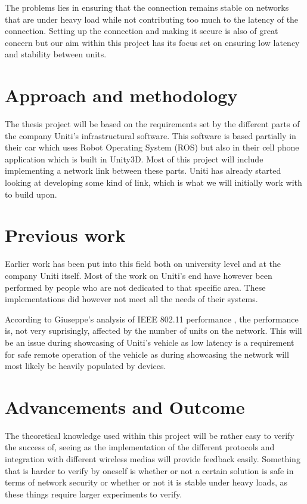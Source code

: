 \documentclass[a4paper]{article}
\begin{document}
The problems lies in ensuring that the connection remains stable on
networks that are under heavy load while not contributing too much to the
latency of the connection. Setting up the connection and making it secure 
is also of great concern but our aim within this project has its focus 
set on ensuring low latency and stability between units.

\section{Approach and methodology}
The thesis project will be based on the requirements set by the different parts
of the company Uniti's infrastructural software. This software is based
partially in their car which uses Robot Operating System (ROS) but also in
their cell phone application which is built in Unity3D. Most of this project
will include implementing a network link between these parts. Uniti has
already started looking at developing some kind of link, which is what
we will initially work with to build upon.


\section{Previous work}
Earlier work has been put into this field both on university level and at the
company Uniti itself. Most of the work on Uniti's end have however been
performed by people who are not dedicated to that specific area.
These implementations did however not meet all the needs of their systems.

According to Giuseppe's analysis of IEEE 802.11 performance
\cite{PAIEEE_article}, the performance is, not very suprisingly, affected by the
number of units on the network. This will be an issue during showcasing of
Uniti's vehicle as low latency is a requirement for safe remote operation of the
vehicle as during showcasing the network will most likely be heavily populated
by devices.


\section{Advancements and Outcome}
The theoretical knowledge used within this project will be rather easy
to verify the success of, seeing as the implementation of the different 
protocols and integration with different wireless medias will provide
feedback easily. Something that is harder to verify by oneself is whether
or not a certain solution is safe in terms of network security or whether
or not it is stable under heavy loads, as these things require larger
experiments to verify.
\end{document}
